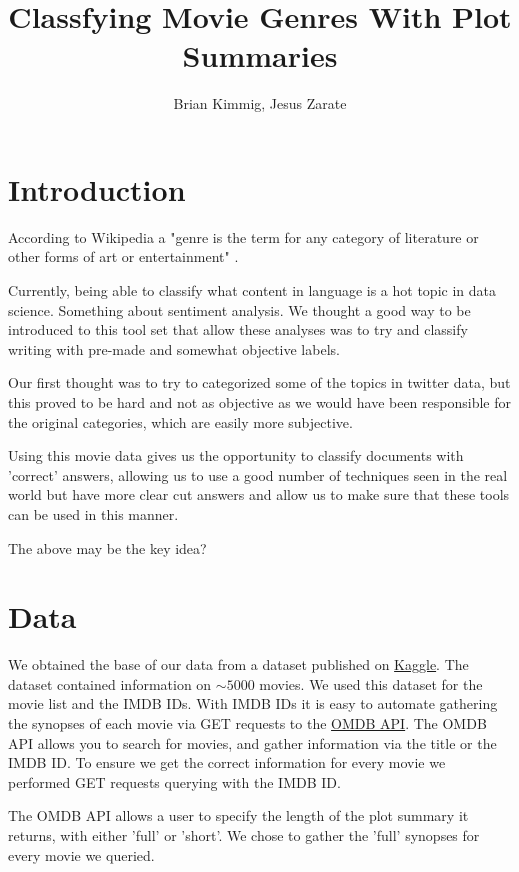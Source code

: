 \documentclass[11pt]{article}
\title{Classfying Movie Genres With Plot Summaries}
\author{Brian Kimmig, Jesus Zarate}
\date{}
\begin{document}
\maketitle


\section{Introduction}
\label{sec:introduction}

According to Wikipedia a "genre is the term for any category of literature or other forms of art or entertainment" \cite{wiki:genres}. 

Currently, being able to classify what content in language is a hot topic in data science. Something about sentiment analysis. We thought a good way to be introduced to this tool set that allow these analyses was to try and classify writing with pre-made and somewhat objective labels. 

Our first thought was to try to categorized some of the topics in twitter data, but this proved to be hard and not as objective as we would have been responsible for the original categories, which are easily more subjective. 

Using this movie data gives us the opportunity to classify documents with 'correct' answers, allowing us to use a good number of techniques seen in the real world but have more clear cut answers and allow us to make sure that these tools can be used in this manner.

The above may be the key idea?

\section{Data}
\label{sec:data}

We obtained the base of our data from a dataset published on \href{https://www.kaggle.com/deepmatrix/imdb-5000-movie-dataset}{Kaggle}. The dataset contained information on $\sim5000$ movies. We used this dataset for the movie list and the IMDB IDs. With IMDB IDs it is easy to automate gathering the synopses of each movie via GET requests to the \href{https://www.omdbapi.com/}{OMDB API}. The OMDB API allows you to search for movies, and gather information via the title or the IMDB ID. To ensure we get the correct information for every movie we performed GET requests querying with the IMDB ID. 

The OMDB API allows a user to specify the length of the plot summary it returns, with either 'full' or 'short'. We chose to gather the 'full' synopses for every movie we queried.
\end{document}
